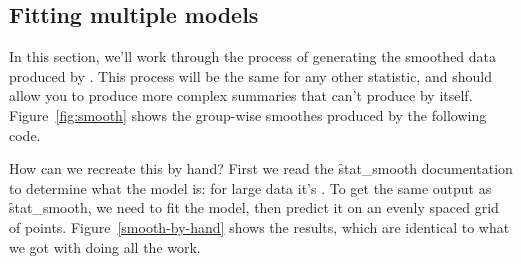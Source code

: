 \subsection{Fitting multiple models}
\label{sub:multiple_models}

In this section, we'll work through the process of generating the smoothed data produced by .  This process will be the same for any other statistic, and should allow you to produce more complex summaries that \ggplot can't produce by itself.  Figure~\ref{fig:smooth} shows the group-wise smoothes produced by the following code.

% 


How can we recreate this by hand?  First we read the \f{stat_smooth} documentation to determine what the model is: for large data it's .  To get the same output as \f{stat_smooth}, we need to fit the model, then predict it on an evenly spaced grid of points.  Figure~\ref{smooth-by-hand} shows the results, which are identical to what we got with \ggplot doing all the work.

% 
%   


